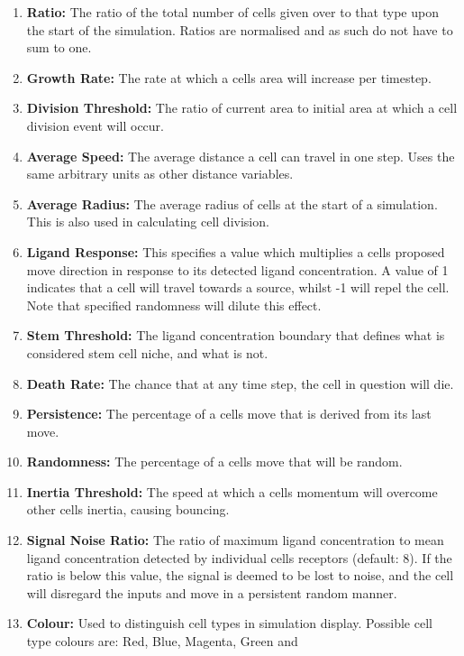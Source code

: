 \documentclass[12pt,a4paper]{report}
\begin{document}
\begin{enumerate}
\item {\bfseries Ratio: }The ratio of the total number of cells given 
over to that type upon the start of the simulation. Ratios are 
normalised and as such do not have to sum to one.
\item {\bfseries Growth Rate: }The rate at which a cells area will 
increase per timestep.
\item {\bfseries Division Threshold: }The ratio of current area to 
initial area at which a cell division event will occur.
\item {\bfseries Average Speed: }The average distance a cell can travel 
in one step. Uses the same arbitrary units as other distance variables.
\item {\bfseries Average Radius: }The average radius of cells at the 
start of a simulation. This is also used in calculating cell division.
\item {\bfseries Ligand Response: }This specifies a value which 
multiplies a cells proposed move direction in response to its detected 
ligand concentration. A value of 1 indicates that a cell will travel 
towards a source, whilst -1 will repel the cell. Note that specified 
randomness will dilute this effect.
\item {\bfseries Stem Threshold: }The ligand concentration boundary that 
defines what is considered stem cell niche, and what is not.
\item {\bfseries Death Rate: }The chance that at any time step, the cell 
in question will die.
\item {\bfseries Persistence: }The percentage of a cells move that is 
derived from its last move.
\item {\bfseries Randomness: }The percentage of a cells move that will be 
random.
\item {\bfseries Inertia Threshold: }The speed at which a cells momentum 
will overcome other cells inertia, causing bouncing.
\item {\bfseries Signal Noise Ratio: }The ratio of maximum ligand 
concentration to mean ligand concentration detected by individual cells 
receptors (default: 8). If the ratio is below this value, the signal is 
deemed to be lost to noise, and the cell will disregard the inputs and 
move in a persistent random manner.
\item {\bfseries Colour:} Used to distinguish cell types in simulation 
display. Possible cell type colours are: Red, Blue, Magenta, Green and 

\end{enumerate}
\end{document}
